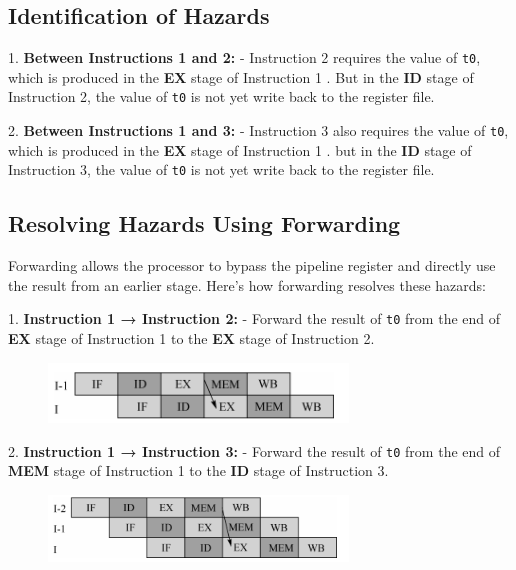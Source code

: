 \documentclass[cn,12pt]{homework}
\begin{document}
\begin{solution}
\subsection*{Identification of Hazards}
1. \textbf{Between Instructions 1 and 2:}  
   - Instruction 2 requires the value of \texttt{t0}, which is produced in the \textbf{EX} stage of Instruction 1 .
   But  in the \textbf{ID} stage of Instruction 2, the value of \texttt{t0} is not yet write back to the register file.


2. \textbf{Between Instructions 1 and 3:}  
   - Instruction 3 also requires the value of \texttt{t0}, which is produced in the \textbf{EX} stage of Instruction 1 .
   but  in the \textbf{ID} stage of Instruction 3, the value of \texttt{t0} is not yet write back to the register file.

\subsection*{Resolving Hazards Using Forwarding}

Forwarding allows the processor to bypass the pipeline register and directly use the result from an earlier stage. Here's how forwarding resolves these hazards:

1. \textbf{Instruction 1 → Instruction 2:}  
   - Forward the result of \texttt{t0} from the end of \textbf{EX} stage of Instruction 1 to the \textbf{EX} stage of Instruction 2.  

  \begin{figure}[H]
    \centering
    \includegraphics[width=0.71\textwidth]{./figures/forward1.png}
    \label{fig:pro1}
  \end{figure}


2. \textbf{Instruction 1 → Instruction 3:}  
   - Forward the result of \texttt{t0} from the end of \textbf{MEM} stage of Instruction 1 to the \textbf{ID} stage of Instruction 3.  


  \begin{figure}[H]
    \centering
    \includegraphics[width=0.71\textwidth]{./figures/forward2.png}
    \label{fig:pro1}
  \end{figure}

\end{solution}
\newpage
\end{document}
